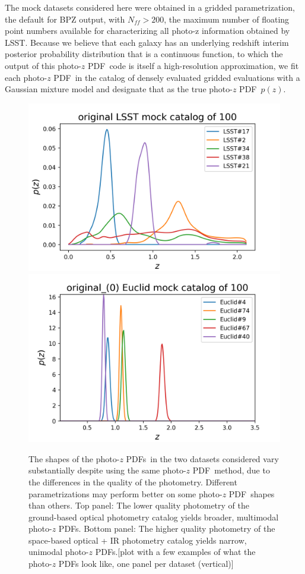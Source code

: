 \documentclass[\docopts]{\docclass}
\newcommand{\pz}{photo-$z$ PDF}
\begin{document}
The mock datasets considered here were obtained in a gridded parametrization, 
the default for BPZ output, with $N_{ff}>200$, the maximum number of floating 
point numbers available for characterizing all photo-z information obtained by 
LSST.  \citep{juric_data_2017}  Because we believe that each galaxy has an 
underlying redshift interim posterior probability distribution that is a 
continuous function, to which the output of this \pz\ code is itself a 
high-resolution approximation, we fit each \pz\ in the catalog of densely 
evaluated gridded evaluations with a Gaussian mixture model and designate that 
as the true \pz\ $p(z)$.

\begin{figure}
  \includegraphics[width=0.9\columnwidth]{figures/lsst_pz_placeholder.png}\\
  \includegraphics[width=0.9\columnwidth]{figures/euclid_pz_placeholder.png}
  \caption{The shapes of the \pz s\ in the two datasets considered vary 
substantially despite using the same \pz\ method, due to the differences in the 
quality of the photometry.  Different parametrizations may perform better on 
some \pz\ shapes than others.  Top panel: The lower quality photometry of the 
ground-based optical photometry catalog yields broader, multimodal \pz s. 
Bottom panel: The higher quality photometry of the space-based optical + IR 
photometry catalog yields narrow, unimodal \pz s.[plot with a few examples of 
what the \pz s look like, one panel per dataset (vertical)]
  \label{fig:pzs}}
\end{figure}
\end{document}
